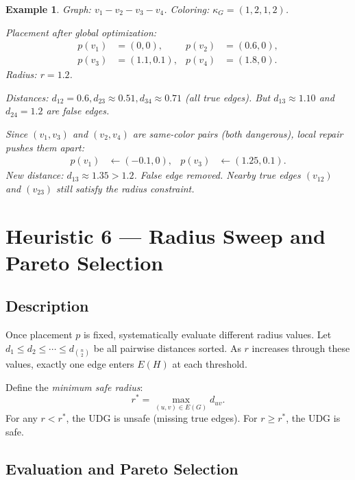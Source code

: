 \documentclass[11pt]{article}
\newtheorem{example}[theorem]{Example}
\begin{document}
\begin{example}
Graph: $v_1 - v_2 - v_3 - v_4$. Coloring: $\kappa_G = (1, 2, 1, 2)$.

Placement after global optimization:
\begin{align*}
  p(v_1) &= (0, 0), & p(v_2) &= (0.6, 0),\\
  p(v_3) &= (1.1, 0.1), & p(v_4) &= (1.8, 0).
\end{align*}
Radius: $r = 1.2$.

Distances: $d_{12} = 0.6, d_{23} \approx 0.51, d_{34} \approx 0.71$ (all true edges).
But $d_{13} \approx 1.10$ and $d_{24} = 1.2$ are false edges.

Since $(v_1, v_3)$ and $(v_2, v_4)$ are same-color pairs (both dangerous), local
repair pushes them apart:
\begin{align*}
  p(v_1) &\leftarrow (-0.1, 0), & p(v_3) &\leftarrow (1.25, 0.1).
\end{align*}
New distance: $d_{13} \approx 1.35 > 1.2$. False edge removed. Nearby true edges
$(v_{12})$ and $(v_{23})$ still satisfy the radius constraint.
\end{example}

\newpage

\section{Heuristic 6 — Radius Sweep and Pareto Selection}

\subsection{Description}

Once placement $p$ is fixed, systematically evaluate different radius values.
Let $d_1 \leq d_2 \leq \cdots \leq d_{\binom{n}{2}}$ be all pairwise distances
sorted. As $r$ increases through these values, exactly one edge enters $E(H)$ at
each threshold.

Define the \emph{minimum safe radius}:
\[
  r^* = \max_{(u,v) \in E(G)} d_{uv}.
\]
For any $r < r^*$, the UDG is unsafe (missing true edges). For $r \geq r^*$,
the UDG is safe.

\subsection{Evaluation and Pareto Selection}
\end{document}
